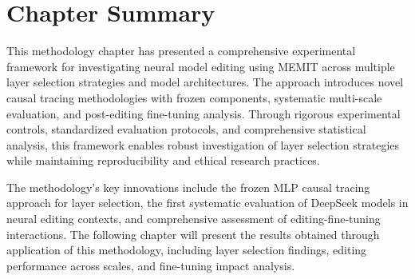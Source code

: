 \section{Chapter Summary}

This methodology chapter has presented a comprehensive experimental framework for investigating neural model editing using MEMIT across multiple layer selection strategies and model architectures. The approach introduces novel causal tracing methodologies with frozen components, systematic multi-scale evaluation, and post-editing fine-tuning analysis. Through rigorous experimental controls, standardized evaluation protocols, and comprehensive statistical analysis, this framework enables robust investigation of layer selection strategies while maintaining reproducibility and ethical research practices.

The methodology's key innovations include the frozen MLP causal tracing approach for layer selection, the first systematic evaluation of DeepSeek models in neural editing contexts, and comprehensive assessment of editing-fine-tuning interactions. The following chapter will present the results obtained through application of this methodology, including layer selection findings, editing performance across scales, and fine-tuning impact analysis.